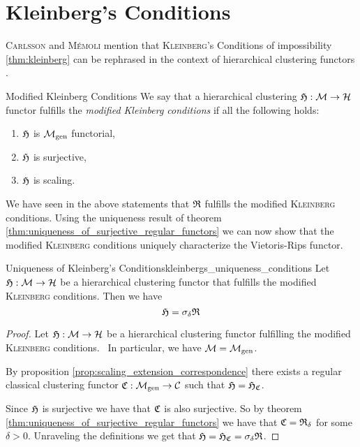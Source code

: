 \section{Kleinberg's Conditions}

\textsc{Carlsson} and \textsc{M\'emoli} mention that \textsc{Kleinberg}'s Conditions of impossibility \ref{thm:kleinberg} can be rephrased in the context of hierarchical clustering functors \cite[Sec.~7.3.1]{Carlsson2010}.

\begin{definition}{Modified Kleinberg Conditions \cite[Sec.~7.3.1]{Carlsson2010}}{}
    We say that a hierarchical clustering $\mathfrak{H}: \mathcal{M} \to \mathcal{H}$ functor fulfills the \emph{modified Kleinberg conditions} if all the following holds:
    \begin{enumerate}
        \item $\mathfrak{H}$ is ${\mathcal{M}_\mathrm{gen}}$ functorial,
        \item $\mathfrak{H}$ is surjective,
        \item $\mathfrak{H}$ is scaling.
    \end{enumerate}
\end{definition}

We have seen in the above statements that $\mathfrak{R}$ fulfills the modified \textsc{Kleinberg} conditions.
Using the uniqueness result of theorem \ref{thm:uniqueness_of_surjective_regular_functors} we can now show that the modified \textsc{Kleinberg} conditions uniquely characterize the Vietoris-Rips functor.

\begin{theorem}{Uniqueness of Kleinberg's Conditions}{kleinbergs_uniqueness_conditions}
    Let $\mathfrak{H}: \mathcal{M} \to \mathcal{H}$ be a hierarchical clustering functor that fulfills the modified \textsc{Kleinberg} conditions. Then we have
    $$
    \mathfrak{H} = \sigma_\delta \mathfrak{R}
    $$
\end{theorem}

\begin{proof}
Let $\mathfrak{H}: \mathcal{M} \to \mathcal{H}$ be a hierarchical clustering functor fulfilling the modified \textsc{Kleinberg} conditions. \Ie\ In particular, we have $\mathcal{M} = {\mathcal{M}_\mathrm{gen}}$.

By proposition \ref{prop:scaling_extension_correspondence} there exists a regular classical clustering functor $\mathfrak{C}: {\mathcal{M}_\mathrm{gen}} \to \mathcal{C}$ such that $\mathfrak{H} = \mathfrak{H}_{\mathfrak{C}}$.

Since $\mathfrak{H}$ is surjective we have that $\mathfrak{C}$ is also surjective. So by theorem \ref{thm:uniqueness_of_surjective_regular_functors} we have that $\mathfrak{C} = \mathfrak{R}_\delta$ for some $\delta > 0$. Unraveling the definitions we get that $\mathfrak{H} = \mathfrak{H}_{\mathfrak{C}} = \sigma_\delta \mathfrak{R}$.
\end{proof}
